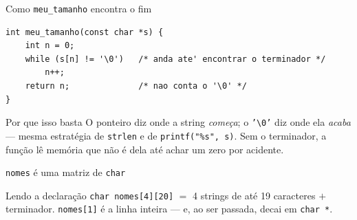 \documentclass[aspectratio=169]{beamer}
\begin{document}
\begin{frame}[fragile]{Como \texttt{meu\_tamanho} encontra o fim}
\begin{lstlisting}[numbers=none, basicstyle=\ttfamily\scriptsize]
int meu_tamanho(const char *s) {
    int n = 0;
    while (s[n] != '\0')   /* anda ate' encontrar o terminador */
        n++;
    return n;              /* nao conta o '\0' */
}
\end{lstlisting}
  \begin{block}{Por que isso basta}
    O ponteiro diz onde a string \emph{começa}; o \texttt{'\textbackslash 0'}
    diz onde ela \emph{acaba} --- mesma estratégia de \texttt{strlen} e de
    \texttt{printf("\%s", s)}. Sem o terminador, a função lê memória que não é
    dela até achar um zero por acidente.
  \end{block}
\end{frame}

\begin{frame}{\texttt{nomes} é uma matriz de \texttt{char}}
  \begin{center}
  \end{center}
  \begin{block}{Lendo a declaração}
    \texttt{char nomes[4][20]} $=$ 4 strings de até 19 caracteres $+$
    terminador. \texttt{nomes[1]} é a linha inteira --- e, ao ser passada,
    decai em \texttt{char *}.
  \end{block}
\end{frame}
\end{document}

